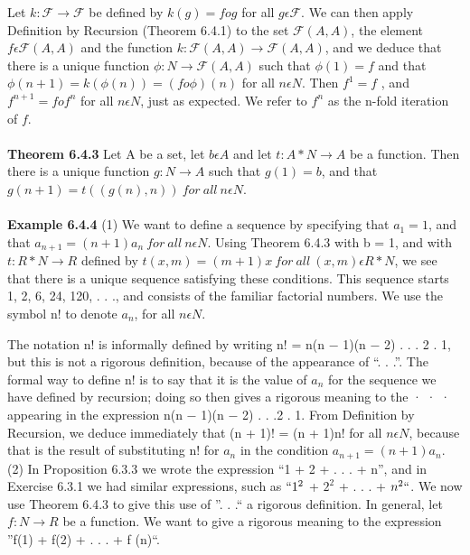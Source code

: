 \documentclass[a4paper,english,12pt]{article}
\begin{document}
Let $k:\mathscr{F}\rightarrow \mathscr{F}$ be defined by $k(g)=f o g$ for all $g\epsilon \mathscr{F}$. We can then apply Definition by Recursion (Theorem 6.4.1) to the set $\mathscr{F}(A,A)$, the element $f\epsilon \mathscr{F}(A,A)$ and the function $k:\mathscr{F}(A,A) \rightarrow \mathscr{F}(A,A)$, and we deduce that there is a unique function $\phi:N\rightarrow \mathscr{F}(A,A)$ such that $\phi(1)=f$ and that $\phi(n+1)=k(\phi(n))=(f o \phi)(n)$ for all $n\epsilon N$. Then $f^1 = f$ , and $f^{n+1} = f o f^n$ for all $n\epsilon N$, just as expected. We refer to $f^n$ as the n-fold iteration of $f$.
\\\\
{\bf Theorem 6.4.3} Let A be a set, let $b\epsilon A$ and let $t:A * N \rightarrow A$ be a function. Then there is a unique function $g:N \rightarrow A$ such that $g(1) = b$, and that $g(n + 1)=t((g(n), n))~ for~ all~ n \epsilon N$.
\\\\
{\bf Example 6.4.4} (1) We want to define a sequence by specifying that $a_1 = 1$, and that $a_{n+1}=(n + 1)a_n~ for~ all~ n\epsilon N.$ Using Theorem 6.4.3 with b = 1, and with $t:R*N\rightarrow R$ defined by $t(x, m) = (m + 1)x ~for~ all~ (x, m)\epsilon R*N$, we see that there is a unique sequence satisfying these conditions. This sequence starts 1, 2, 6, 24, 120, . . ., and consists of the familiar factorial numbers. We use the symbol n! to denote $a_n$, for all $n\epsilon N$. 

The notation n! is informally defined by writing n! = n(n − 1)(n − 2) . . . 2 . 1, but this is not a rigorous definition, because of the appearance of ``. . .''. The formal way to define n! is to say that it is the value of $a_n$ for the sequence we have defined by recursion; doing so then gives a rigorous meaning to the · · · appearing in the expression n(n − 1)(n − 2) . . .2 . 1. From Definition by Recursion, we deduce immediately that (n + 1)! = (n + 1)n! for all $n\epsilon N$, because that is the result of substituting n! for $a_n$ in the condition $a_{n+1}=(n + 1)a_n$.\\
(2) In Proposition 6.3.3 we wrote the expression ``1 + 2 + . . . + n'', and in Exercise 6.3.1 we had similar expressions, such as $``1^2$ + $2^2$ + . . . + $n^2``$. We now use Theorem 6.4.3 to give this use of ''. . .`` a rigorous definition. In general, let $f : N \rightarrow R$ be a function. We want to give a rigorous meaning to the expression ''f(1) + f(2) + . . . + f (n)``.
 
\end{document}
